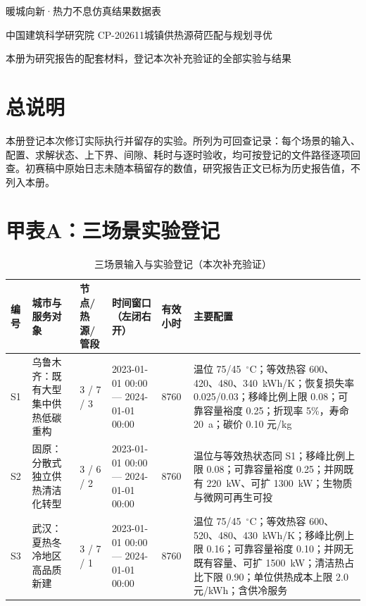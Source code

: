 \documentclass[12pt,a4paper]{article}
\newcommand{\xiaosi}{\fontsize{12pt}{12pt}\selectfont}
\newcommand{\sanhao}{\fontsize{16pt}{16pt}\selectfont}
\begin{document}
\begin{center}
{\headingfont\sanhao 暖城向新·热力不息\quad 仿真结果数据表\par}
\vspace{6pt}
{\xiaosi 中国建筑科学研究院 CP-202611\quad 城镇供热源荷匹配与规划寻优\par}
\vspace{4pt}
{\xiaosi 本册为研究报告的配套材料，登记本次补充验证的全部实验与结果\par}
\end{center}
\vspace{6pt}

\section*{总说明}

本册登记本次修订实际执行并留存的实验。所列为可回查记录：每个场景的输入、配置、求解状态、上下界、间隙、耗时与逐时验收，均可按登记的文件路径逐项回查。初赛稿中原始日志未随本稿留存的数值，研究报告正文已标为历史报告值，不列入本册。

\section*{甲\quad 表A：三场景实验登记}

\begin{table}[H]
\centering
\caption{三场景输入与实验登记（本次补充验证）}
\label{tab:alg-annex-a}
\small
\begin{tabularx}{\textwidth}{@{}p{}p{}p{}p{}p{}X@{}}
\toprule
编号 & 城市与服务对象 & 节点/热源/管段 & 时间窗口（左闭右开） & 有效小时 & 主要配置\\ \midrule
S1 & 乌鲁木齐：既有大型集中供热低碳重构 & 3 / 7 / 3 & 2023-01-01 00:00 --- 2024-01-01 00:00 & 8760 & 温位 75/45~$^{\circ}$C；等效热容 600、420、480、340~kWh/K；恢复损失率 0.025/0.03；移峰比例上限 0.08；可靠容量裕度 0.25；折现率 5\%，寿命 20~a；碳价 0.10 元/kg\\ \addlinespace
S2 & 固原：分散式独立供热清洁化转型 & 3 / 6 / 2 & 2023-01-01 00:00 --- 2024-01-01 00:00 & 8760 & 温位与等效热状态同 S1；移峰比例上限 0.08；可靠容量裕度 0.25；并网既有 220~kW、可扩 1300~kW；生物质与微网可再生可投\\ \addlinespace
S3 & 武汉：夏热冬冷地区高品质新建 & 3 / 7 / 1 & 2023-01-01 00:00 --- 2024-01-01 00:00 & 8760 & 温位 75/45~$^{\circ}$C；等效热容 600、520、480、430~kWh/K；移峰比例上限 0.16；可靠容量裕度 0.10；并网无既有容量、可扩 1500~kW；清洁热占比下限 0.90；单位供热成本上限 2.0 元/kWh；含供冷服务\\ \bottomrule
\end{tabularx}
\end{table}
\end{document}
